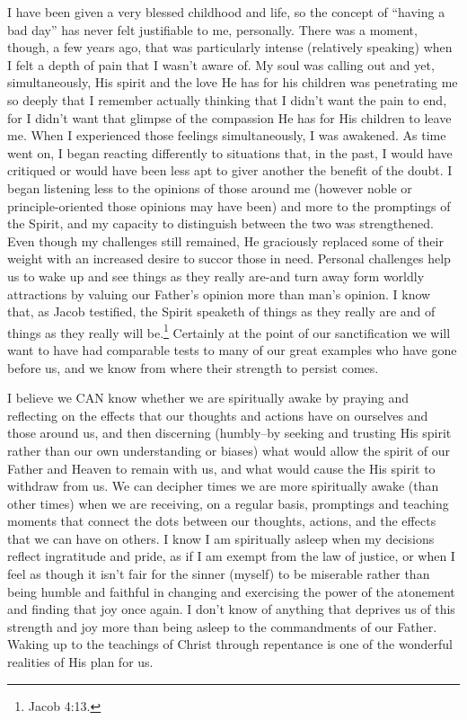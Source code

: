 			I have been given a very blessed childhood and life, so the concept of ``having a bad day'' has never felt justifiable to me, personally. There was a moment, though, a few years ago, that was particularly intense (relatively speaking) when I felt a depth of pain that I wasn't aware of. My soul was calling out and yet, simultaneously, His spirit and the love He has for his children was penetrating me so deeply that I remember actually thinking that I didn't want the pain to end, for I didn't want that glimpse of the compassion He has for His children to leave me. When I experienced those feelings simultaneously, I was awakened. As time went on, I began reacting differently to situations that, in the past, I would have critiqued or would have been less apt to giver another the benefit of the doubt. I began listening less to the opinions of those around me (however noble or principle-oriented those opinions may have been) and more to the promptings of the Spirit, and my capacity to distinguish between the two was strengthened. Even though my challenges still remained, He graciously replaced some of their weight with an increased desire to succor those in need. Personal challenges help us to wake up and see things as they really are-and turn away form worldly attractions by valuing our Father's opinion more than man's opinion. I know that, as Jacob testified, the Spirit speaketh of things as they really are and of things as they really will be.\footnote{Jacob 4:13.} Certainly at the point of our sanctification we will want to have had comparable tests to many of our great examples who have gone before us, and we know from where their strength to persist comes.

			I believe we CAN know whether we are spiritually awake by praying and reflecting on the effects that our thoughts and actions have on ourselves and those around us, and then discerning (humbly--by seeking and trusting His spirit rather than our own understanding or biases) what would allow the spirit of our Father and Heaven to remain with us, and what would cause the His spirit to withdraw from us. We can decipher times we are more spiritually awake (than other times) when we are receiving, on a regular basis, promptings and teaching moments that connect the dots between our thoughts, actions, and the effects that we can have on others. I know I am spiritually asleep when my decisions reflect ingratitude and pride, as if I am exempt from the law of justice, or when I feel as though it isn't fair for the sinner (myself) to be miserable rather than being humble and faithful in changing and exercising the power of the atonement and finding that joy once again. I don't know of anything that deprives us of this strength and joy more than being asleep to the commandments of our Father. Waking up to the teachings of Christ through repentance is one of the wonderful realities of His plan for us.
			
